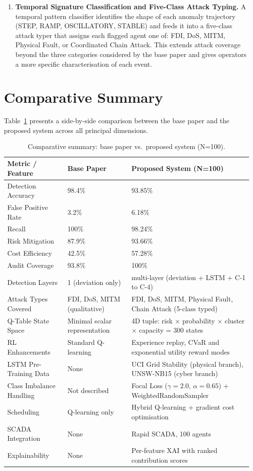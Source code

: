 \begin{enumerate}
    \item \textbf{Temporal Signature Classification and Five-Class Attack Typing.} A temporal pattern classifier identifies the shape of each anomaly trajectory (STEP, RAMP, OSCILLATORY, STABLE) and feeds it into a five-class attack typer that assigns each flagged agent one of: FDI, DoS, MITM, Physical Fault, or Coordinated Chain Attack. This extends attack coverage beyond the three categories considered by the base paper and gives operators a more specific characterisation of each event.
\end{enumerate}


\section{Comparative Summary}

Table~\ref{tab:base_vs_proposed} presents a side-by-side comparison between the base paper and the proposed system across all principal dimensions.

\begin{table}[H]
\centering
\caption{Comparative summary: base paper vs.\ proposed system (N=100).}
\label{tab:base_vs_proposed}
\begin{tabular}{|l|p{3.5cm}|p{5.5cm}|}
\hline
\textbf{Metric / Feature} & \textbf{Base Paper} & \textbf{Proposed System (N=100)} \\ \hline
Detection Accuracy & 98.4\% & 93.85\% \\ \hline
False Positive Rate & 3.2\% & 6.18\% \\ \hline
Recall & 100\% & 98.24\% \\ \hline
Risk Mitigation & 87.9\% & 93.66\% \\ \hline
Cost Efficiency & 42.5\% & 57.28\% \\ \hline
Audit Coverage & 93.8\% & 100\% \\ \hline
Detection Layers & 1 (deviation only) & multi-layer (deviation + LSTM + C-1 to C-4) \\ \hline
Attack Types Covered & FDI, DoS, MITM (qualitative) & FDI, DoS, MITM, Physical Fault, Chain Attack (5-class typed) \\ \hline
Q-Table State Space & Minimal scalar representation & 4D tuple: risk $\times$ probability $\times$ cluster $\times$ capacity = 300 states \\ \hline
RL Enhancements & Standard Q-learning & Experience replay, CVaR and exponential utility reward modes \\ \hline
LSTM Pre-Training Data & None & UCI Grid Stability (physical branch), UNSW-NB15 (cyber branch) \\ \hline
Class Imbalance Handling & Not described & Focal Loss ($\gamma=2.0$, $\alpha=0.65$) + WeightedRandomSampler \\ \hline
Scheduling & Q-learning only & Hybrid Q-learning + gradient cost optimisation \\ \hline
SCADA Integration & None & Rapid SCADA, 100 agents \\ \hline
Explainability & None & Per-feature XAI with ranked contribution scores \\ \hline
\end{tabular}
\end{table}

